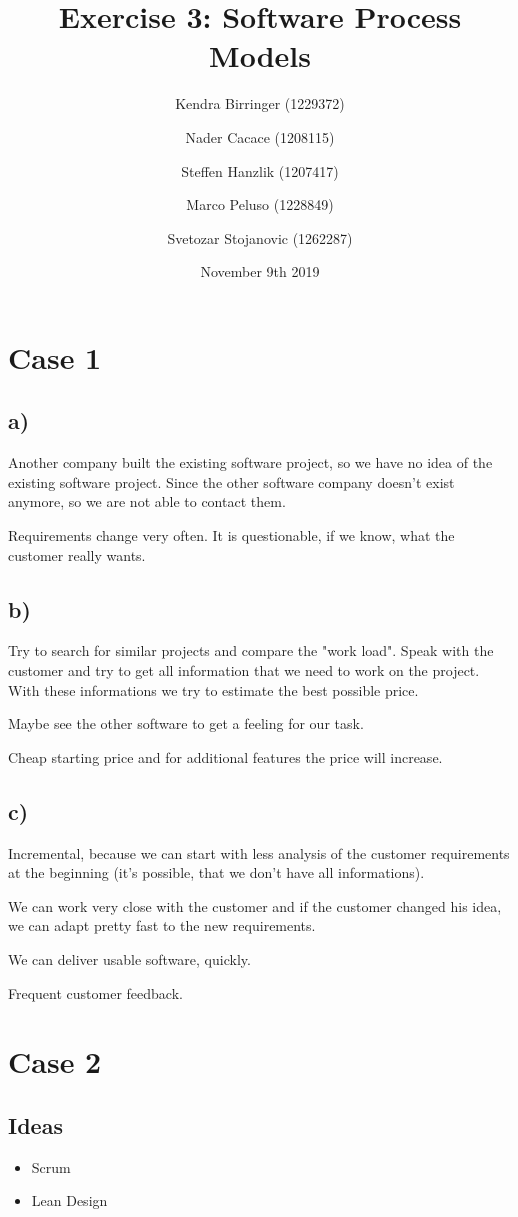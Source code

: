 \documentclass[a4paper, 12pt]{article}
\title{Exercise 3: Software Process Models}
\author{
  Kendra Birringer (1229372)\and
  Nader Cacace (1208115)\and
  Steffen Hanzlik (1207417)\and
  Marco Peluso (1228849)\and
  Svetozar Stojanovic (1262287)\and
}
\date{November 9th 2019}
\begin{document}
\maketitle
\newpage

\section{Case 1}
\subsection{a)}
Another company built the existing software project, so we have no idea of the existing software project. Since the other software company doesn't exist anymore, so we are not able to contact them.

Requirements change very often. It is questionable, if we know, what the customer really wants.

\subsection{b)}
Try to search for similar projects and compare the "work load". Speak with the customer and try to get all information that we need to work on the project. With these informations we try to estimate the best possible price. 

Maybe see the other software to get a feeling for our task.

Cheap starting price and for additional features the price will increase.

\subsection{c)}
Incremental, because we can start with less analysis of the customer requirements at the beginning (it's possible, that we don't have all informations).

We can work very close with the customer and if the customer changed his idea, we can adapt pretty fast to the new requirements.

We can deliver usable software, quickly.

Frequent customer feedback.

\newpage
\section{Case 2}
\subsection{Ideas}
\begin{itemize}
    \item Scrum
    \item Lean Design
\end{itemize}
\end{document}

